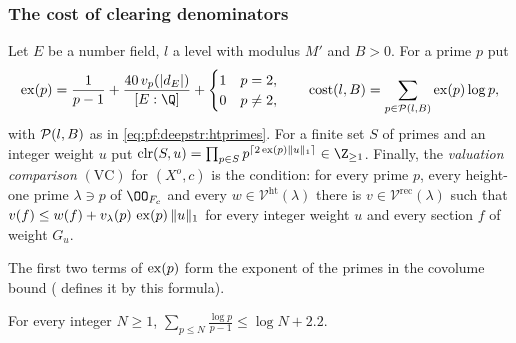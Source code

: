 \subsubsection*{The cost of clearing denominators}

\begin{definition}[Cost]\label{def:pf:deepstr:cost}
Let $E$ be a number field, $l$ a level with modulus $M'$ and $B>0$. For a prime $p$ put
\[
\deepstrex(p)=\frac1{p-1}+\frac{40\,v_p(|d_E|)}{[E:\Q]}+\begin{cases}1&p=2,\\0&p\ne2,\end{cases}\qquad
\deepstrcost(l,B)=\sum_{p\in\deepstrPrimes(l,B)}\deepstrex(p)\log p,
\]
with $\mathcal{P}(l,B)$ as in \eqref{eq:pf:deepstr:htprimes}. For a finite set $S$ of primes and an
integer weight $u$ put $\deepstrclear(S,u)=\prod_{p\in S}p^{\lceil2\deepstrex(p)\|u\|_1\rceil}\in\Z_{\ge1}$.
Finally, the \emph{valuation comparison} $\mathrm{(VC)}$ for $(X^o,c)$ is the condition: for every prime $p$,
every height-one prime $\lambda\ni p$ of $\OO_{F_c}$ and every $w\in\mathcal V^{\mathrm{ht}}(\lambda)$ there is
$v\in\mathcal V^{\mathrm{rec}}(\lambda)$ such that $v(f)\le w(f)+v_\lambda(p)\,\operatorname{ex}(p)\,\|u\|_1$ for every
integer weight $u$ and every section $f$ of weight $G_u$.
\end{definition}

The first two terms of $\operatorname{ex}(p)$ form the exponent of the primes in the covolume bound
( defines it by this formula).

\begin{lemma}\label{lem:pf:deepstr:mertens}
For every integer $N\ge1$, $\displaystyle\sum_{p\le N}\frac{\log p}{p-1}\le\log N+2.2$.
\end{lemma}

